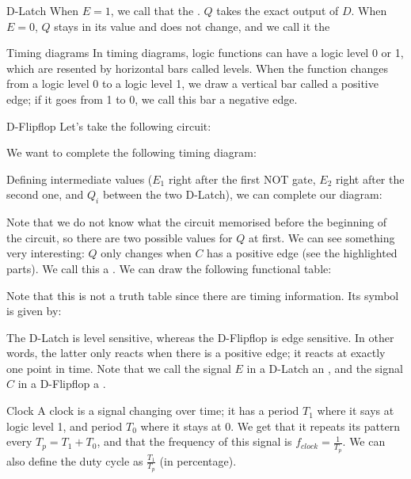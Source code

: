 \documentclass[a4paper]{article}
\begin{document}
\begin{parag}{D-Latch}
    When $E = 1$, we call that the . $Q$ takes the exact output of $D$. When $E = 0$, $Q$ stays in its value and does not change, and we call it the 
\end{parag}

\begin{parag}{Timing diagrams}
    In timing diagrams, logic functions can have a logic level 0 or 1, which are resented by horizontal bars called levels. When the function changes from a logic level 0 to a logic level 1, we draw a vertical bar called a positive edge; if it goes from 1 to 0, we call this bar a negative edge.
\end{parag}

\begin{parag}{D-Flipflop}
    Let's take the following circuit:

    We want to complete the following timing diagram:

    Defining intermediate values ($E_1$ right after the first NOT gate, $E_2$ right after the second one, and $Q_i$ between the two D-Latch), we can complete our diagram:

    Note that we do not know what the circuit memorised before the beginning of the circuit, so there are two possible values for $Q$ at first. We can see something very interesting: $Q$ only changes when $C$ has a positive edge (see the highlighted parts). We call this a . We can draw the following functional table:

    Note that this is not a truth table since there are timing information. Its symbol is given by:

     The D-Latch is level sensitive, whereas the D-Flipflop is edge sensitive. In other words, the latter only reacts when there is a positive edge; it reacts at exactly one point in time. Note that we call the signal $E$ in a D-Latch an , and the signal $C$ in a D-Flipflop a .

\end{parag}

\begin{parag}{Clock}
    A clock is a signal changing over time; it has a period $T_1$ where it says at logic level 1, and period $T_0$ where it stays at 0. We get that it repeats its pattern every $T_p = T_1 + T_0$, and that the frequency of this signal is $f_{clock} = \frac{1}{T_p}$. We can also define the duty cycle as $\frac{T_1}{T_p}$ (in percentage).
    
\end{parag}
\end{document}
